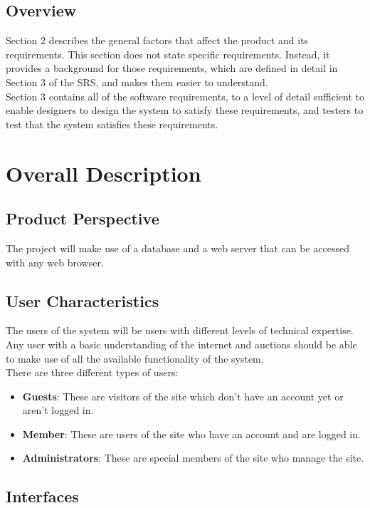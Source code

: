 \documentclass[a4paper, 12pt]{report}
\begin{document}
\section{Overview}
	Section 2 describes the general factors that affect the product and 
	its requirements.                                                                                   
	This section does not state specific requirements. Instead, it provides a 
	background for those requirements, which are defined in detail in Section 
	3 of the SRS, and makes them easier to understand.\\
	Section 3 contains all of the software requirements, to a level of detail 
	sufficient to enable designers to design the system to satisfy these 
	requirements, and testers to test that the system satisfies these
	requirements.

\chapter{Overall Description}

\section{Product Perspective}
	The project will make use of a database and a web server that can be 
	accessed with any web browser.
\section{User Characteristics}
	The users of the system will be users with different levels of 
	technical expertise. Any user with a basic understanding of the 
	internet and auctions should be able to make use of all the 
	available functionality of the system.\\
	There are three different types of users:
	\begin{itemize}
		\item \textbf{Guests}: These are visitors of the site which don't 
		have an account yet or aren't logged in.
		\item \textbf{Member}: These are users of the site who have an 
		account and are logged in.
		\item \textbf{Administrators}: These are special members of the 
		site who manage the site.
	\end{itemize}
\section{Interfaces}
\end{document}
